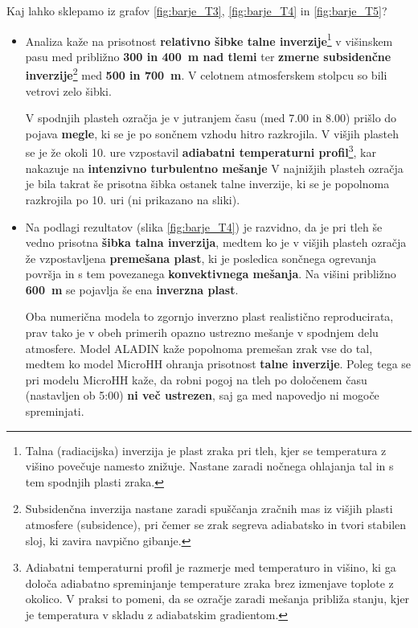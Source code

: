 \documentclass[mat2, tisk]{fmfdelo}
\begin{document}
Kaj lahko sklepamo iz grafov \ref{fig:barje_T3}, \ref{fig:barje_T4} in \ref{fig:barje_T5}?
\begin{itemize}
  \item 
  Analiza kaže na prisotnost \textbf{relativno šibke talne inverzije}\footnote{Talna (radiacijska) inverzija je plast zraka pri tleh, kjer se temperatura z višino povečuje namesto znižuje. Nastane zaradi nočnega ohlajanja tal in s tem spodnjih plasti zraka.} 
  v višinskem pasu med približno \textbf{300 in 400~m nad tlemi} ter 
  \textbf{zmerne subsidenčne inverzije}\footnote{Subsidenčna inverzija nastane zaradi spuščanja zračnih mas iz višjih plasti atmosfere (subsidence), pri čemer se zrak segreva adiabatsko in tvori stabilen sloj, ki zavira navpično gibanje.} 
  med \textbf{500 in 700~m}. 
  V celotnem atmosferskem stolpcu so bili vetrovi zelo šibki. 
  
  V spodnjih plasteh ozračja je v {jutranjem času (med 7.00 in 8.00)} prišlo do pojava \textbf{megle}, 
  ki se je po sončnem vzhodu hitro razkrojila. 
  V višjih plasteh se je že okoli {10. ure} vzpostavil \textbf{adiabatni temperaturni profil}\footnote{Adiabatni temperaturni profil je razmerje med temperaturo in višino, ki ga določa adiabatno spreminjanje temperature zraka brez izmenjave toplote z okolico. V praksi to pomeni, da se ozračje zaradi mešanja približa stanju, kjer je temperatura v skladu z adiabatskim gradientom.}, 
  kar nakazuje na \textbf{intenzivno turbulentno mešanje} 
  V najnižjih plasteh ozračja je bila takrat še prisotna šibka ostanek talne inverzije, 
  ki se je popolnoma razkrojila po {10. uri} (ni prikazano na sliki).
  
 \item Na podlagi rezultatov (slika \ref{fig:barje_T4}) je razvidno, da je pri tleh še vedno prisotna 
\textbf{šibka talna inverzija}, medtem ko je v višjih plasteh ozračja že vzpostavljena 
\textbf{premešana plast}, ki je posledica {sončnega ogrevanja površja} in s tem povezanega 
\textbf{konvektivnega mešanja}. 
Na višini približno \textbf{600~m} se pojavlja še ena \textbf{inverzna plast}. 

\newpage
Oba numerična modela to zgornjo inverzno plast {realistično reproducirata}, 
prav tako je v obeh primerih opazno ustrezno mešanje v spodnjem delu atmosfere. 
Model {ALADIN} 
kaže popolnoma {premešan zrak vse do tal}, medtem ko model 
{MicroHH} ohranja prisotnost \textbf{talne inverzije}. 
Poleg tega se pri modelu MicroHH kaže, da {robni pogoj na tleh} 
po določenem času (nastavljen ob {5:00}) \textbf{ni več ustrezen}, saj ga med napovedjo ni mogoče spreminjati. 


\end{itemize}
\end{document}
